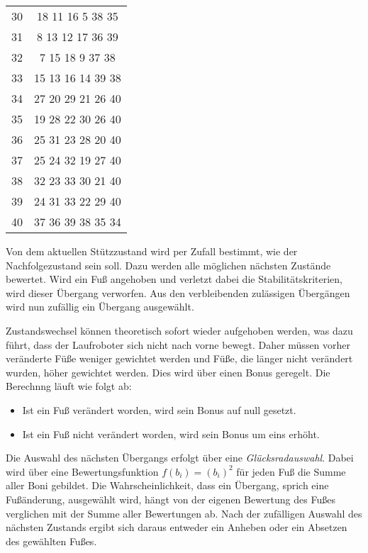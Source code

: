 \begin{table}[t!]
\begin{footnotesize}
\begin{tabular}{S[table-format=1.3,table-comparator=true,table-space-text-post={***}] c}
    30&18 11 16 5 38 35 \\
    31&8 13 12 17 36 39 \\ 
    32&7 15 18 9 37 38 \\
    33&15 13 16 14 39 38 \\
    34&27 20 29 21 26 40 \\
    35&19 28 22 30 26 40 \\  
    36&25 31 23 28 20 40 \\
    37&25 24 32 19 27 40 \\
    38&32 23 33 30 21 40 \\
    39&24 31 33 22 29 40 \\
    40&37 36 39 38 35 34 \\
    \bottomrule
    \end{tabular}
  \end{footnotesize}
  \rmfamily
\end{table}

Von dem aktuellen Stützzustand wird per Zufall bestimmt, wie der Nachfolgezustand sein soll. Dazu werden alle möglichen nächsten Zustände bewertet. Wird ein Fuß angehoben und verletzt dabei die Stabilitätskriterien, wird dieser Übergang verworfen. Aus den verbleibenden zulässigen Übergängen wird nun zufällig ein Übergang ausgewählt.

Zustandswechsel können theoretisch sofort wieder aufgehoben werden, was dazu führt, dass der Laufroboter sich nicht nach vorne bewegt. Daher müssen vorher veränderte Füße weniger gewichtet werden und Füße, die länger nicht verändert wurden, höher gewichtet werden. Dies wird über einen Bonus geregelt. Die Berechnng läuft wie folgt ab:

\begin{itemize}
  \item Ist ein Fuß verändert worden, wird sein Bonus auf null gesetzt.
  \item Ist ein Fuß nicht verändert worden, wird sein Bonus um eins erhöht.
\end{itemize}

Die Auswahl des nächsten Übergangs erfolgt über eine \emph{Glücksradauswahl}. Dabei wird über eine Bewertungsfunktion $f(b_i) = (b_i)^2$ für jeden Fuß die Summe aller Boni gebildet. Die Wahrscheinlichkeit, dass ein Übergang, sprich eine Fußänderung, ausgewählt wird, hängt von der eigenen Bewertung des Fußes verglichen mit der Summe aller Bewertungen ab. Nach der zufälligen Auswahl des nächsten Zustands ergibt sich daraus entweder ein Anheben oder ein Absetzen des gewählten Fußes.

